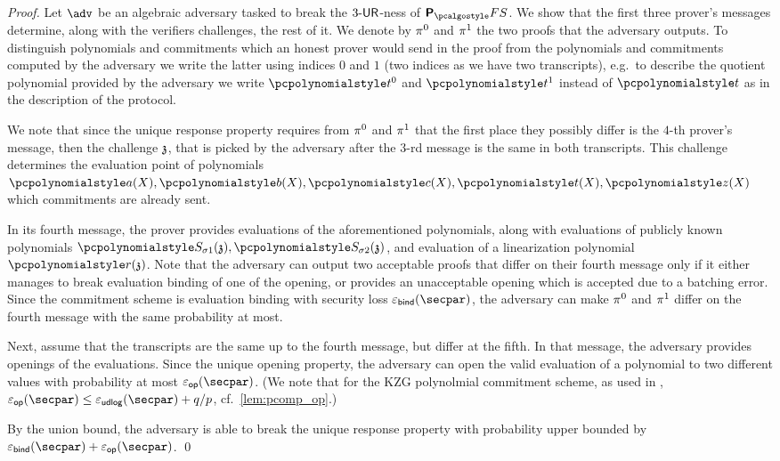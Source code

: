 \begin{proof}
    Let $\adv$ be an algebraic adversary tasked to break the ${3\text{-}\mathsf{UR}}$-ness of
      $\plonkprotfs$. We show that the first three prover's messages determine, along with 	the verifiers challenges, the rest of it. We denote by $\pi^0$ and $\pi^1$ the two proofs that the adversary outputs. To distinguish polynomials and commitments which an honest prover would send in the proof from the polynomials and commitments computed by the adversary we write the latter using indices $0$ and $1$ (two indices as we have two transcripts), e.g.~to describe the quotient polynomial provided by the adversary we write $\p{t}^0$ and $\p{t}^1$ instead of $\p{t}$ as in the description of the protocol.
  
    We note that since the unique response property requires from $\pi^{0}$ and $\pi^{1}$ that the first place they possibly differ is the $4$-th prover's message, then the challenge $\mathfrak{z}$, that is picked by the adversary after the $3$-rd message is the same in both transcripts. This challenge determines the evaluation point of polynomials $\p{a}(X), \p{b}(X), \p{c}(X), \p{t}(X), \p{z}(X)$ which commitments are already sent.
  
    In its fourth message, the prover provides evaluations of the aforementioned polynomials, along with evaluations of publicly known polynomials $
    \p{S_{\sigma 1}} (\chz), \p{S_{\sigma 2}} (\chz)$, and evaluation of a linearization polynomial $\p{r}(\chz)$.
    Note that the adversary can output two acceptable proofs that differ on their fourth message only if it either manages to break evaluation binding of one of the opening, or provides an unacceptable opening which is accepted due to a batching error. Since the commitment scheme is evaluation binding with security loss $\epsbinding (\secpar)$,
    the adversary can make $\pi^{0}$ and $\pi^{1}$ differ on the fourth message with the same probability at most. 
  
    Next, assume that the transcripts are the same up to the fourth message, but differ at the fifth. In that message, the adversary provides openings of the evaluations. Since the unique opening property, the adversary can open the valid evaluation of a polynomial to two different values with probability at most $\epsop (\secpar)$. (We note that for the KZG polynolmial commitment scheme, as used in \cite{EPRINT:GabWilCio19}, $\epsop (\secpar) \leq \epsudlog (\secpar) + \infrac{q}{p}$, cf.~\cref{lem:pcomp_op}.)
  
    By the union bound, the adversary is able to break the unique response property with probability upper bounded by $\epsbinding (\secpar) + \epsop (\secpar)$.
    \qed
    \end{proof}

